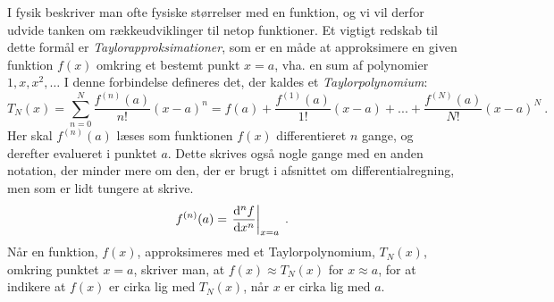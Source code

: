 I fysik beskriver man ofte fysiske størrelser med en funktion, og vi vil derfor udvide tanken om rækkeudviklinger til netop funktioner. %
Et vigtigt redskab til dette formål er \emph{Taylorapproksimationer}, som er en måde at approksimere en given funktion $f(x)$ omkring et bestemt punkt $x=a$, vha. en sum af polynomier $1,x,x^2,\ldots$ I denne forbindelse defineres det, der kaldes et \emph{Taylorpolynomium}:
%
\begin{equation}
\label{mat:eq:Taylor_pol}
T_N(x) = \sum\limits_{n = 0}^{N} \frac{f^{(n)}(a)}{n!} (x-a)^n = f(a) + \frac{f^{(1)}(a)}{1!} (x-a)  + ... + \frac{f^{(N)}(a)}{N!}(x-a)^N  \ .
\end{equation}
%
Her skal $f^{(n)}(a)$ læses som funktionen $f(x)$ differentieret $n$ gange, og derefter evalueret i punktet $a$. Dette skrives også nogle gange med en anden notation, der minder mere om den, der er brugt i afsnittet om differentialregning, men som er lidt tungere at skrive.
\begin{equation} \label{mat:eq:diff_eval}
f^{(n)}(a) = \left.\dv[n]{f}{x}\right|_ {x=a} \; .
\end{equation}
Når en funktion, $f(x)$, approksimeres med et Taylorpolynomium, $T_N(x)$, omkring punktet $x=a$, skriver man, at $f(x) \approx T_N(x)$ for $x \approx a$, for at indikere at $f(x)$ er cirka lig med $T_N(x)$, når $x$ er cirka lig med $a$.\\


